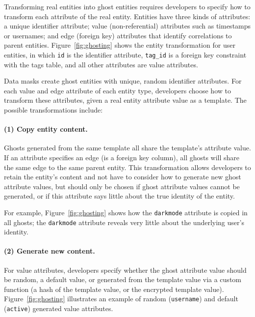 Transforming real entities into ghost entities requires developers to specify how to transform each
attribute of the real entity.
%
Entities have three kinds of attributes: a unique identifier attribute; value
(non-referential) attributes such as timestamps or usernames; and edge (\eg foreign key)
attributes that identify correlations to parent entities.
%
Figure~\ref{fig:ghosting} shows the entity transformation for user entities, in which \texttt{id} is 
the identifier attribute, 
\texttt{tag\_id} is a foreign key constraint with the tags table, and all other attributes are value
attributes.

Data masks create ghost entities with unique, random identifier attributes.
For each value and edge attribute of each entity type, developers choose how to transform these
attributes, given a real entity attribute value as a template. 
The possible transformations include:

\paragraph{(1) Copy entity content.} Ghosts generated from the same template all share the template's
    attribute value. If an attribute specifies an edge (\eg is a foreign key column), 
    all ghosts will share the same edge to the same parent entity.
    This transformation allows developers to retain the entity's content and not have to
    consider how to generate new ghost attribute values, but 
    should only be chosen if ghost attribute values cannot be generated, or if this
    attribute says little about the true identity of the entity. 

    For example, Figure~\ref{fig:ghosting} shows how the \texttt{darkmode} attribute is copied in
    all ghosts; the \texttt{darkmode} attribute reveals very little about the underlying user's
    identity.

\paragraph{(2) Generate new content.}
        For value attributes, developers specify whether the ghost attribute value should be random,
        a default value, or generated from the template value via a custom function (\eg a hash of
        the template value, or the encrypted template value). Figure~\ref{fig:ghosting} illustrates
        an example of random (\texttt{username}) and default (\texttt{active}) generated value attributes.

